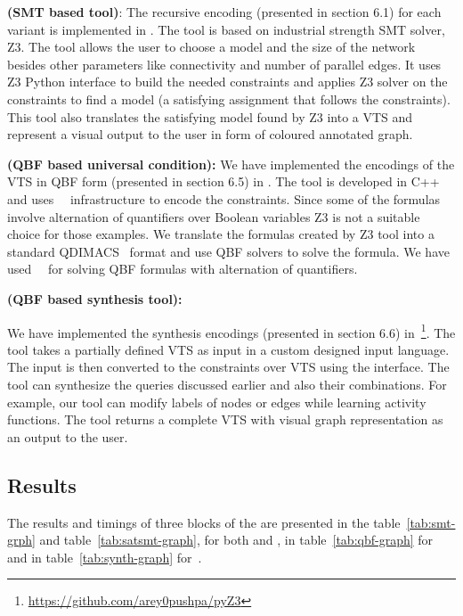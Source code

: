 \textbf{{\smttool} (SMT based tool)}:
The recursive encoding (presented in section 6.1)  
for each variant is implemented in {\smttool}.
%
The tool is based on industrial strength SMT solver, Z3. 
%
The tool allows the user to choose a model and the size
of the network besides other parameters like connectivity and number of parallel edges. 
%		
It uses Z3 Python interface to build the needed constraints and applies Z3 solver on the constraints to find a model (a satisfying assignment that follows the constraints). 
%
This tool also translates the satisfying model found by Z3 into
a VTS and represent a visual output to the user in form of coloured annotated graph. 
%
%
 

\textbf{{\qbftool} (QBF based universal condition):}
We have implemented the encodings of the VTS in QBF form (presented in section 6.5) in
{\qbftool}. 
%
The tool is developed in C++ and uses~\zthree~\cite{z3} infrastructure to encode the constraints.
%
Since some of the formulas involve alternation of quantifiers over Boolean variables Z3 is not a suitable choice for those examples.
%
We translate the formulas created by Z3 tool into a standard
QDIMACS~\cite{qdimacs} format and use QBF solvers to solve the formula. 
%
We have used~\depqbf~\cite{lonsing2010depqbf} for solving QBF formulas with alternation of quantifiers. 

\textbf{{\ourtool} (QBF based synthesis tool):}

We have implemented the synthesis encodings (presented in section 6.6) in~\ourtool\footnote{{\url{https://github.com/arey0pushpa/pyZ3}}}.
%
The tool takes a partially defined VTS as input in a custom designed
input language.
%
The input is then converted to the constraints over VTS using the {\qbftool} interface. 
%
The tool can synthesize the queries discussed earlier and also their combinations.
%
For example, our tool can modify labels of nodes or edges while
learning activity functions.
%
The tool returns a complete VTS with visual graph representation as an output to the user.  

\subsection{Results}
The results and timings of three blocks of the {\vtstool} are presented in the table~\ref{tab:smt-grph} and table~\ref{tab:satsmt-graph}, for both {\sattool} and {\smttool}, in table~\ref{tab:qbf-graph} for {\qbftool} and in table~\ref{tab:synth-graph} for~{\ourtool}.



